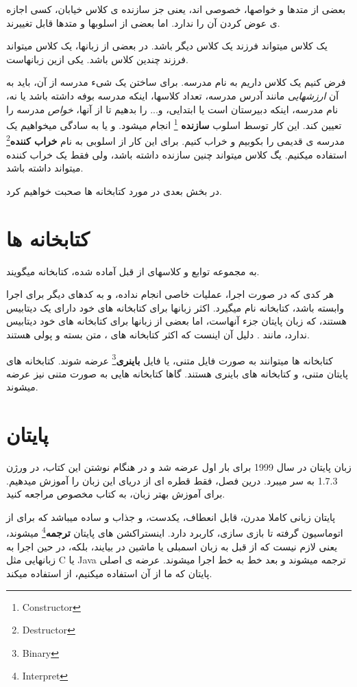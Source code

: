 \documentclass[14pt,a4paper]{memoir}
\begin{document}
	 بعضی از متدها و خواصها، خصوصی اند، یعنی جز سازنده ی کلاس خیابان، کسی اجازه ی عوض کردن آن را ندارد. اما بعضی از اسلوبها و متدها قابل تغییرند.
	 
	 یک کلاس میتواند فرزند یک کلاس دیگر باشد. در بعضی از زبانها، یک کلاس میتواند فرزند چندین کلاس باشد.  یکی ازین زبانهاست.
	 
	 فرض کنیم یک کلاس داریم به نام مدرسه. برای ساختن یک شیء مدرسه از آن، باید به آن \textit{ارزشهایی} مانند آدرس مدرسه، تعداد کلاسها، اینکه مدرسه بوفه داشته باشد یا نه، نام مدرسه، اینکه دبیرستان است یا ابتدایی، و... را بدهیم تا از آنها، \textit{خواص} مدرسه را تعیین کند. این کار توسط اسلوب \textbf{سازنده} \footnote{Constructor} انجام میشود. و یا به سادگی میخواهیم یک مدرسه ی قدیمی را بکوبیم و خراب کنیم. برای این کار از اسلوبی به نام \textbf{خراب کننده}\footnote{Destructor} استفاده میکنیم. 
	 یگ کلاس میتواند چنین سازنده داشته باشد، ولی فقط یک خراب کننده میتواند داشته باشد.
	 
	 در بخش بعدی در مورد کتابخانه ها صحبت خواهیم کرد.
	 
	 \section{کتابخانه ها}\label{lib}
	 
	 به مجموعه توابع و کلاسهای از قبل آماده شده، کتابخانه میگویند.
	 
	 هر کدی که در صورت اجرا، عملیات خاصی انجام نداده، و به کدهای دیگر برای اجرا وابسته باشد، کتابخانه نام میگیرد.
	 اکثر زبانها برای کتابخانه های خود دارای یک دیتابیس هستند، که زبان پایتان جزء آنهاست، اما بعضی از زبانها برای کتابخانه های خود دیتابیس ندارد، مانند . دلیل آن اینست که اکثر کتابخانه های ، متن بسته و پولی هستند.
	 
	 کتابخانه ها میتوانند به صورت فایل متنی، یا فایل \textbf{باینری}\footnote{Binary} عرضه شوند. کتابخانه های پایتان متنی، و کتابخانه های  باینری هستند. گاها کتابخانه هایی به صورت متنی نیز عرضه میشوند.
	 
	 
	 \section{پایتان}\label{py}
	 
	 زبان پایتان در سال 1999 برای بار اول عرضه شد و در هنگام نوشتن این کتاب، در ورژن 1.7.3 به سر میبرد. درین فصل، فقط قطره ای از دریای این زبان را آموزش میدهیم. برای آموزش بهتر زبان، به کتاب مخصوص مراجعه کنید.
	 
	 پایتان زبانی کاملا مدرن، قابل انعطاف، یکدست، و جذاب و ساده میباشد که برای از اتوماسیون گرفته تا بازی سازی، کاربرد دارد. 
	 اینستراکشن های پایتان \textbf{ترجمه}\footnote{Interpret} میشوند، یعنی لازم نیست که از قبل به زبان اسمبلی یا ماشین در بیایند، بلکه، در حین اجرا به زبانهایی مثل C یا Java ترجمه میشوند و بعد خط به خط اجرا میشوند. عرضه ی اصلی پایتان که ما از آن استفاده میکنیم، از  استفاده میکند.
	 
\end{document}
